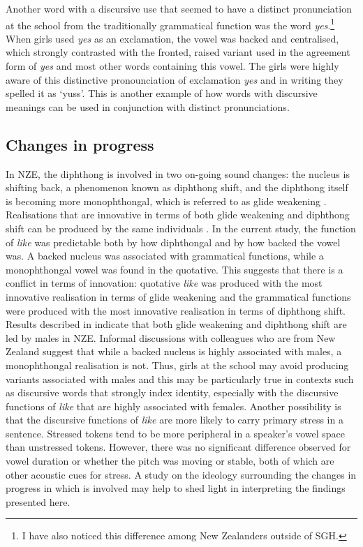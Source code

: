 Another word with a discursive use that seemed to have a distinct pronunciation at the school from the traditionally grammatical function was the word \textit{yes}.\footnote{I have also noticed this difference among New Zealanders outside of SGH.} When girls used \textit{yes} as an exclamation, the vowel was backed and centralised, which strongly contrasted with the fronted, raised variant used in the agreement form of \textit{yes} and most other words containing this vowel. The girls were highly aware of this distinctive pronounciation of exclamation \textit{yes} and in writing they spelled it as `yuss'. This is another example of how words with discursive meanings can be used in conjunction with distinct pronunciations.


\subsection{Changes in progress}
In NZE, the diphthong  is involved in two on-going sound changes: the nucleus is shifting back, a phenomenon known as diphthong shift, \citep[149]{onzebook} and the diphthong itself is becoming more monophthongal, which is referred to as glide weakening \citep{onzebook,chartres2008}. Realisations that are innovative in terms of both glide weakening and diphthong shift can be produced by the same individuals \citep{chartres2008}. In the current study, the function of \textit{like} was predictable both by how diphthongal and by how backed the vowel was. A backed nucleus was associated with grammatical functions, while a monophthongal vowel was found in the quotative. This suggests that there is a conflict in terms of innovation: quotative \textit{like} was produced with the most innovative realisation in terms of glide weakening and the grammatical functions were produced with the most innovative realisation in terms of diphthong shift. Results described in \citet{chartres2008} indicate that both glide weakening and diphthong shift are led by males in NZE. Informal discussions with colleagues who are from New Zealand suggest that while a backed nucleus is highly associated with males, a monophthongal realisation is not. Thus, girls at the school may avoid producing variants associated with males and this may be particularly true in contexts such as discursive words that strongly index identity, especially with the discursive functions of \textit{like} that are highly associated with females. Another possibility is that the discursive functions of \textit{like} are more likely to carry primary stress in a sentence. Stressed tokens tend to be more peripheral in a speaker's vowel space than unstressed tokens. However, there was no significant difference observed for vowel duration or whether the pitch was moving or stable, both of which are other acoustic cues for stress. A study on the ideology surrounding the changes in progress in which  is involved may help to shed light in interpreting the findings presented here.

